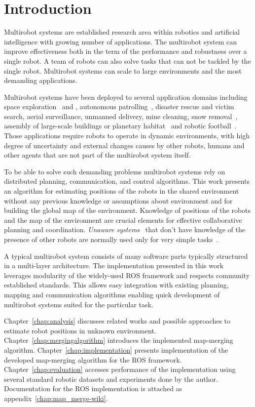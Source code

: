 \chapter*{Introduction}

Multirobot systems are established research area within robotics and artificial intelligence with growing number of applications. The multirobot system can improve effectiveness both in the term of the performance and robustness over a single robot. A team of robots can also solve tasks that can not be tackled by the single robot. Multirobot systems can scale to large environments and the most demanding applications.

Multirobot systems have been deployed to several application domains including space exploration~\cite{goldberg2002distributedspace} and \cite{huntsberger2003campout}, autonomous patrolling~\cite{parker2003parolling100}, disaster rescue and victim search, aerial surveillance, unmanned delivery, mine cleaning, snow removal~\cite{choset2001coverage}, assembly of large-scale buildings or planetary habitat~\cite{goldberg2002distributedspace} and robotic football~\cite{asada1999robocup}. Those applications require robots to operate in  dynamic environments, with high degree of uncertainty and external changes causes by other robots, humans and other agents that are not part of the multirobot system itself.

To be able to solve such demanding problems multirobot systems rely on distributed planning, communication, and control algorithms. This work presents an algorithm for estimating positions of the robots in the shared environment without any previous knowledge or assumptions about environment and for building the global map of the environment. Knowledge of positions of the robots and the map of the environment are crucial elements for effective collaborative planning and coordination. \textit{Unaware systems}~\cite{farinelli2004multirobot} that don't have knowledge of the presence of other robots are normally used only for very
simple tasks~\cite{farinelli2004multirobot}.

A typical multirobot system consists of many software parts typically structured in a multi-layer architecture. The implementation presented in this work leverages modularity of the widely-used \gls{ROS} framework and respects community established standards. This allows easy integration with existing planning, mapping and communication algorithms enabling quick development of multirobot systems suited for the particular task.

Chapter~\ref{chap:analysis} discusses related works and possible approaches to estimate robot positions in unknown environment. Chapter~\ref{chap:mergingalgorithm} introduces the implemented map-merging algorithm. Chapter~\ref{chap:implementation} presents implementation of the developed map-merging algorithm for the \gls{ROS} framework. Chapter~\ref{chap:evaluation} accesses performance of the implementation using several standard robotic datasets and experiments done by the author. Documentation for the \gls{ROS} implementation is attached as appendix~\ref{chap:map_merge-wiki}.
